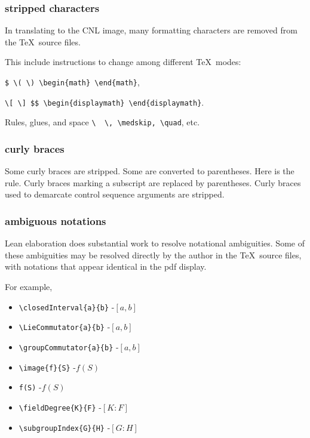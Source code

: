 \documentclass[12pt]{amsart}
\begin{document}
\subsubsection{stripped characters}

In translating to the CNL image, 
many formatting characters are removed from the \TeX\ source files.

This include instructions to change among different
\TeX\ modes:  

\verb!$ \( \) \begin{math} \end{math}!, 

\verb!\[ \] $$ \begin{displaymath} \end{displaymath}!.

Rules, glues, and space \verb!\  \, \medskip, \quad!, etc.

\subsubsection{curly braces}

Some curly braces are stripped.  Some are converted to
parentheses.  Here is the rule.  Curly braces marking a
subscript are replaced by parentheses.  Curly braces used
to demarcate control sequence arguments are stripped.



\subsubsection{ambiguous notations}

Lean elaboration does substantial work to resolve
notational ambiguities.  Some of these ambiguities
may be resolved directly by the author in the
\TeX\ source files, with notations that appear identical
in the pdf display.

For example,
\begin{itemize}
\item \verb!\closedInterval{a}{b}! -\qquad $[a,b]$
\item \verb!\LieCommutator{a}{b}! -\qquad $[a,b]$
\item \verb!\groupCommutator{a}{b}! -\qquad $[a,b]$
\item \verb!\image{f}{S}! -\qquad $f(S)$
\item \verb!f(S)! -\qquad $f(S)$
\item \verb!\fieldDegree{K}{F}! -\qquad $[K:F]$
\item \verb!\subgroupIndex{G}{H}! -\qquad $[G:H]$
\end{itemize}
\end{document}
